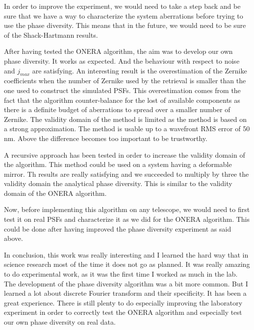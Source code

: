 In order to improve the experiment, we would need to take a step back and be sure that we have a way to characterize the system aberrations before trying to use the phase diversity. This means that in the future, we would need to be sure of the Shack-Hartmann results.

\vspace{1cm}

After having tested the ONERA algorithm, the aim was to develop our own phase diversity. It works as expected. And the behaviour with respect to noise and $j_{max}$ are satisfying. An interesting result is the overestimation of the Zernike coefficients when the number of Zernike used by the retrieval is smaller than the one used to construct the simulated PSFs. This overestimation comes from the fact that the algorithm counter-balance for the lost of available components as there is a definite budget of aberrations to spread over a smaller number of Zernike. The validity domain of the method is limited as the method is based on a strong approximation. The method is usable up to a wavefront RMS error of 50 nm. Above the difference becomes too important to be trustworthy. 

A recursive approach has been tested in order to increase the validity domain of the algorithm. This method could be used on a system having a deformable mirror. Th results are really satisfying and we succeeded to multiply by three the validity domain the analytical phase diversity. This is similar to the validity domain of the ONERA algorithm.

Now, before implementing this algorithm on any telescope, we would need to first test it on real PSFs and characterize it as we did for the ONERA algorithm. This could be done after having improved the phase diversity experiment as said above.

\vspace{1cm}

In conclusion, this work was really interesting and I learned the hard way that in science research most of the time it does not go as planned. It was really amazing to do experimental work, as it was the first time I worked as much in the lab. The development of the phase diversity algorithm was a bit more common. But I learned a lot about discrete Fourier transform and their specificity. It has been a great experience. There is still plenty to do especially improving the laboratory experiment in order to correctly test the ONERA algorithm and especially test our own phase diversity on real data. 